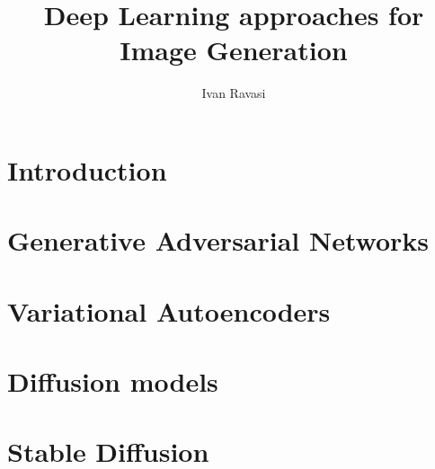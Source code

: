 \documentclass{beamer}
\title[Image generation through DL]{Deep Learning approaches for Image Generation}
\author[I. Ravasi]{Ivan Ravasi}
\begin{document}
    \frame{\titlepage}
    \section{Introduction}
    
    \section{Generative Adversarial Networks}
    
    \section{Variational Autoencoders}
    \section{Diffusion models}
    
    \section{Stable Diffusion}
    
\end{document}
